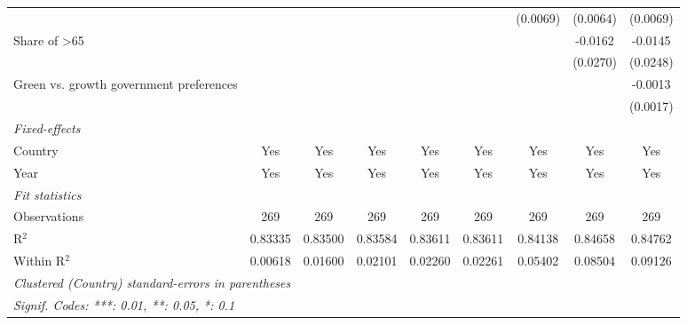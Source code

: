 \begin{table}[htbp]
\begin{tabular}{lcccccccc}
                                                         &          &          &          &          &          & (0.0069) & (0.0064) & (0.0069)\\   
      Share of >65                                       &          &          &          &          &          &          & -0.0162  & -0.0145\\   
                                                         &          &          &          &          &          &          & (0.0270) & (0.0248)\\   
      Green vs. growth government preferences            &          &          &          &          &          &          &          & -0.0013\\   
                                                         &          &          &          &          &          &          &          & (0.0017)\\   
      \midrule
      \emph{Fixed-effects}\\
      Country                                            & Yes      & Yes      & Yes      & Yes      & Yes      & Yes      & Yes      & Yes\\  
      Year                                               & Yes      & Yes      & Yes      & Yes      & Yes      & Yes      & Yes      & Yes\\  
      \midrule
      \emph{Fit statistics}\\
      Observations                                       & 269      & 269      & 269      & 269      & 269      & 269      & 269      & 269\\  
      R$^2$                                              & 0.83335  & 0.83500  & 0.83584  & 0.83611  & 0.83611  & 0.84138  & 0.84658  & 0.84762\\  
      Within R$^2$                                       & 0.00618  & 0.01600  & 0.02101  & 0.02260  & 0.02261  & 0.05402  & 0.08504  & 0.09126\\  
      \midrule \midrule
      \multicolumn{9}{l}{\emph{Clustered (Country) standard-errors in parentheses}}\\
      \multicolumn{9}{l}{\emph{Signif. Codes: ***: 0.01, **: 0.05, *: 0.1}}\\
   \end{tabular}
\end{table}


